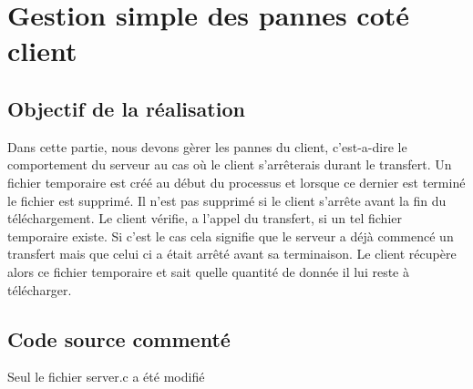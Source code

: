 \documentclass{report}
\begin{document}
    \chapter{Gestion simple des pannes cot\'e client}
      \section{Objectif de la r\'ealisation}
	Dans cette partie, nous devons g\`erer les pannes du client, c'est-a-dire le comportement du serveur au cas o\`u le client s'arr\^eterais
  durant le transfert.
  Un fichier temporaire est cr\'e\'e au d\'ebut du processus et lorsque ce dernier est termin\'e le fichier est supprim\'e.
  Il n'est pas supprim\'e si le client s'arr\^ete avant la fin du t\'el\'echargement. Le client v\'erifie, a l'appel du transfert,
  si un tel fichier temporaire existe. Si c'est le cas cela signifie que le serveur a d\'ej\`a commenc\'e un transfert
  mais que celui ci a \'etait arr\^et\'e avant sa terminaison.
  Le client r\'ecup\`ere alors ce fichier temporaire et sait quelle quantit\'e de donn\'ee il lui reste \`a t\'el\'echarger. \\
      \section{Code source comment\'e}
      Seul le fichier server.c a \'et\'e modifi\'e
\end{document}
